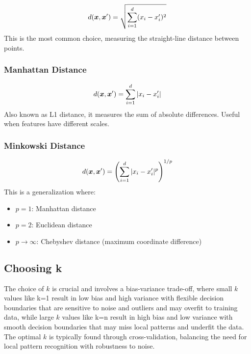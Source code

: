 \begin{definition}
\begin{equation}
d(\boldsymbol{x}, \boldsymbol{x}') = \sqrt{\sum_{i=1}^{d} (x_i - x_i')^2}
\end{equation}
This is the most common choice, measuring the straight-line distance between points.
\end{definition}

\subsubsection{Manhattan Distance}

\begin{definition}
\begin{equation}
d(\boldsymbol{x}, \boldsymbol{x}') = \sum_{i=1}^{d} |x_i - x_i'|
\end{equation}
Also known as L1 distance, it measures the sum of absolute differences. Useful when features have different scales.
\end{definition}

\subsubsection{Minkowski Distance}

\begin{definition}
\begin{equation}
d(\boldsymbol{x}, \boldsymbol{x}') = \left(\sum_{i=1}^{d} |x_i - x_i'|^p\right)^{1/p}
\end{equation}
This is a generalization where:
\begin{itemize}
    \item $p = 1$: Manhattan distance
    \item $p = 2$: Euclidean distance
    \item $p \to \infty$: Chebyshev distance (maximum coordinate difference)
\end{itemize}
\end{definition}

\subsection{Choosing k}

The choice of $k$ is crucial and involves a bias-variance trade-off, where small $k$ values like k=1 result in low bias and high variance with flexible decision boundaries that are sensitive to noise and outliers and may overfit to training data, while large $k$ values like k=n result in high bias and low variance with smooth decision boundaries that may miss local patterns and underfit the data. The optimal $k$ is typically found through cross-validation, balancing the need for local pattern recognition with robustness to noise.

